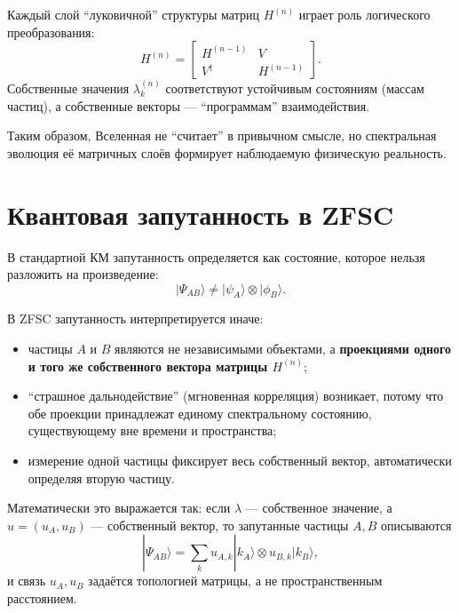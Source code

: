 \documentclass[12pt,a4paper]{article}
\begin{document}
Каждый слой ``луковичной'' структуры матриц $H^{(n)}$ играет роль логического преобразования:
\[
H^{(n)} =
\begin{bmatrix}
H^{(n-1)} & V \\
V^\dagger & H^{(n-1)}
\end{bmatrix}.
\]
Собственные значения $\lambda_k^{(n)}$ соответствуют устойчивым состояниям (массам частиц), а собственные векторы --- ``программам'' взаимодействия.

Таким образом, Вселенная не ``считает'' в привычном смысле, но спектральная эволюция её матричных слоёв формирует наблюдаемую физическую реальность.

\section{Квантовая запутанность в ZFSC}
В стандартной КМ запутанность определяется как состояние, которое нельзя разложить на произведение:
\[
|\Psi_{AB}\rangle \neq |\psi_A\rangle \otimes |\phi_B\rangle.
\]

В ZFSC запутанность интерпретируется иначе:
\begin{itemize}
  \item частицы $A$ и $B$ являются не независимыми объектами, а \textbf{проекциями одного и того же собственного вектора матрицы $H^{(n)}$};
  \item ``страшное дальнодействие'' (мгновенная корреляция) возникает, потому что обе проекции принадлежат единому спектральному состоянию, существующему вне времени и пространства;
  \item измерение одной частицы фиксирует весь собственный вектор, автоматически определяя вторую частицу.
\end{itemize}

Математически это выражается так:  
если $\lambda$ --- собственное значение, а $u = (u_A, u_B)$ --- собственный вектор, то запутанные частицы $A,B$ описываются
\[
|\Psi_{AB}\rangle = \sum_k u_{A,k} |k_A\rangle \otimes u_{B,k} |k_B\rangle,
\]
и связь $u_A, u_B$ задаётся топологией матрицы, а не пространственным расстоянием.

\end{document}
